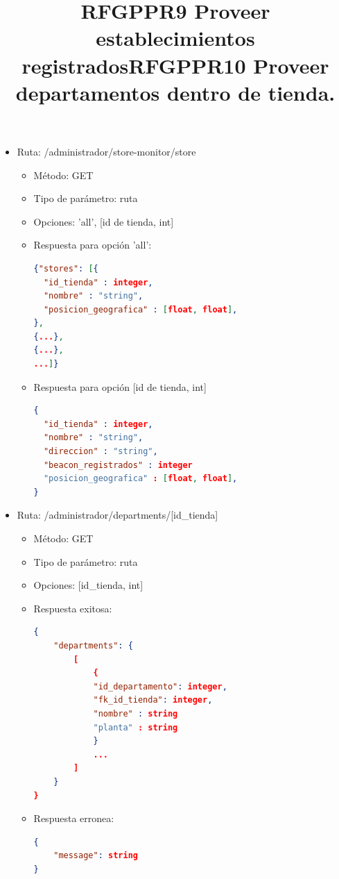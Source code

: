 \title{\textbf{RFGPPR9 Proveer establecimientos registrados}}
\begin{itemize}
\item Ruta: /administrador/store-monitor/{store}
\begin{itemize}
\item Método: GET
\item Tipo de parámetro: ruta
\item Opciones: 'all', [id de tienda, int]
\item Respuesta para opción 'all':
\begin{lstlisting}[language=json,firstnumber=1]
{"stores": [{
  "id_tienda" : integer,
  "nombre" : "string",
  "posicion_geografica" : [float, float],
},
{...},
{...},
...]}
\end{lstlisting}

\item Respuesta para opción [id de tienda, int]
\begin{lstlisting}[language=json,firstnumber=1]
{
  "id_tienda" : integer,
  "nombre" : "string",
  "direccion" : "string",
  "beacon_registrados" : integer
  "posicion_geografica" : [float, float],
}
\end{lstlisting}
\end{itemize}
\end{itemize}


\title{\textbf{RFGPPR10 Proveer departamentos dentro de tienda.}}
\begin{itemize}
\item Ruta: /administrador/departments/[id\_tienda]
\begin{itemize}
\item Método: GET
\item Tipo de parámetro: ruta
\item Opciones: [id\_tienda, int] 
\item Respuesta exitosa: 
\begin{lstlisting}[language=json,firstnumber=1]
{
	"departments": {
		[
			{
			"id_departamento": integer,
			"fk_id_tienda": integer,
			"nombre" : string
			"planta" : string
			}
			...		
		]	
	}
}
\end{lstlisting}
\item Respuesta erronea: 
\begin{lstlisting}[language=json,firstnumber=1]
{
	"message": string 
}
\end{lstlisting}
\end{itemize}
\end{itemize}

